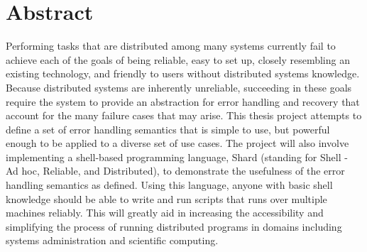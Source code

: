 \documentclass[twoside]{report}
\begin{document}



\tableofcontents
\listoffigures
\listoftables
\onehalfspacing

\chapter*{Abstract}

Performing tasks that are distributed among many systems currently fail to achieve each of the goals of being reliable, easy to set up, closely resembling an existing technology, and friendly to users without distributed systems knowledge.
Because distributed systems are inherently unreliable, succeeding in these goals require the system to provide an abstraction for error handling and recovery that account for the many failure cases that may arise.
This thesis project attempts to define a set of error handling semantics that is simple to use, but powerful enough to be applied to a diverse set of use cases.
The project will also involve implementing a shell-based programming language, Shard (standing for Shell - Ad hoc, Reliable, and Distributed), to demonstrate the usefulness of the error handling semantics as defined.
Using this language, anyone with basic shell knowledge should be able to write and run scripts that runs over multiple machines reliably.
This will greatly aid in increasing the accessibility and simplifying the process of running distributed programs in domains including systems administration and scientific computing.
\end{document}
